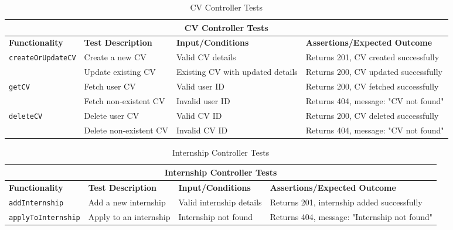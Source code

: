 \begin{table}[ht]
\centering
\begin{tabular}{|p{3.2cm}|p{4cm}|p{3.5cm}|p{5cm}|}
\hline
\multicolumn{4}{|c|}{\textbf{CV Controller Tests}} \\
\hline
\textbf{Functionality} & \textbf{Test Description} & \textbf{Input/Conditions} & \textbf{Assertions/Expected Outcome} \\
\hline
\multirow{2}{*}{\texttt{createOrUpdateCV}}
 & Create a new CV
 & Valid CV details
 & Returns 201, CV created successfully \\ \cline{2-4}
 & Update existing CV
 & Existing CV with updated details
 & Returns 200, CV updated successfully \\
\hline
\multirow{2}{*}{\texttt{getCV}}
 & Fetch user CV
 & Valid user ID
 & Returns 200, CV fetched successfully \\ \cline{2-4}
 & Fetch non-existent CV
 & Invalid user ID
 & Returns 404, message: "CV not found" \\
\hline
\multirow{2}{*}{\texttt{deleteCV}}
 & Delete user CV
 & Valid CV ID
 & Returns 200, CV deleted successfully \\ \cline{2-4}
 & Delete non-existent CV
 & Invalid CV ID
 & Returns 404, message: "CV not found" \\
\hline
\end{tabular}
\caption{CV Controller Tests}
\label{tab:cv_controller_tests}
\end{table}

\begin{table}[ht]
\centering
\begin{tabular}{|p{3.5cm}|p{4cm}|p{3.5cm}|p{5cm}|}
\hline
\multicolumn{4}{|c|}{\textbf{Internship Controller Tests}} \\
\hline
\textbf{Functionality} & \textbf{Test Description} & \textbf{Input/Conditions} & \textbf{Assertions/Expected Outcome} \\
\hline
\texttt{addInternship} &
Add a new internship &
Valid internship details &
Returns 201, internship added successfully \\
\hline
\texttt{applyToInternship} &
Apply to an internship &
Internship not found &
Returns 404, message: "Internship not found" \\
\hline
\end{tabular}
\caption{Internship Controller Tests}
\label{tab:internship_controller_tests}
\end{table}

